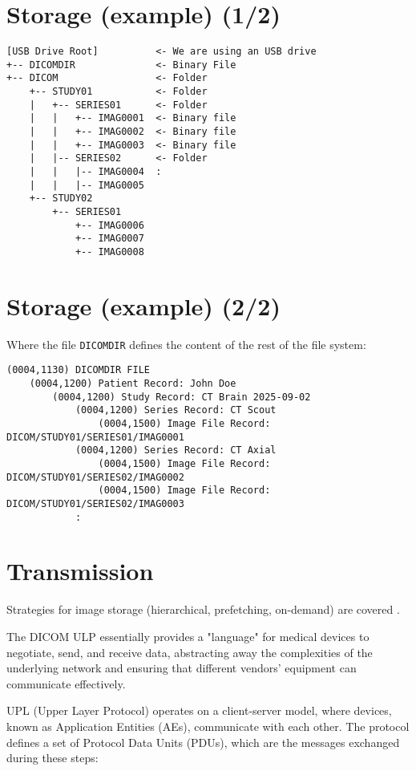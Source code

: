 \section{Storage (example) (1/2)}
\begin{verbatim}
[USB Drive Root]          <- We are using an USB drive
+-- DICOMDIR              <- Binary File
+-- DICOM                 <- Folder
    +-- STUDY01           <- Folder
    |   +-- SERIES01      <- Folder
    |   |   +-- IMAG0001  <- Binary file
    |   |   +-- IMAG0002  <- Binary file
    |   |   +-- IMAG0003  <- Binary file
    |   |-- SERIES02      <- Folder
    |   |   |-- IMAG0004  :
    |   |   |-- IMAG0005
    +-- STUDY02
        +-- SERIES01
            +-- IMAG0006
            +-- IMAG0007
            +-- IMAG0008
\end{verbatim}

\section*{Storage (example) (2/2)}
Where the file \texttt{DICOMDIR} defines the content of the rest of the file system:
\begin{verbatim}
(0004,1130) DICOMDIR FILE
    (0004,1200) Patient Record: John Doe
        (0004,1200) Study Record: CT Brain 2025-09-02
            (0004,1200) Series Record: CT Scout
                (0004,1500) Image File Record: DICOM/STUDY01/SERIES01/IMAG0001
            (0004,1200) Series Record: CT Axial
                (0004,1500) Image File Record: DICOM/STUDY01/SERIES02/IMAG0002
                (0004,1500) Image File Record: DICOM/STUDY01/SERIES02/IMAG0003
            :
\end{verbatim}

\section{Transmission}
Strategies for image storage (hierarchical, prefetching, on-demand)
are covered \cite{bushberg2011essential}.

The DICOM ULP essentially provides a "language" for medical devices to negotiate, send, and receive data, abstracting away the complexities of the underlying network and ensuring that different vendors' equipment can communicate effectively.

UPL (Upper Layer Protocol) operates on a client-server model, where devices, known as Application Entities (AEs), communicate with each other. The protocol defines a set of Protocol Data Units (PDUs), which are the messages exchanged during these steps:

